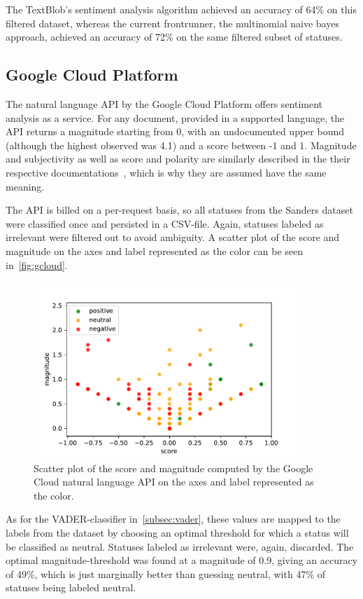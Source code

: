The TextBlob's sentiment analysis algorithm achieved an accuracy of 64\% on this filtered dataset,
whereas the current frontrunner, the multinomial naive bayes approach,
achieved an accuracy of 72\% on the same filtered subset of statuses.

\subsection{Google Cloud Platform}
\label{subsec:googlecloud}

The natural language API by the Google Cloud Platform offers sentiment analysis as a service.
For any document, provided in a supported language, the API returns a magnitude starting from 0, with an undocumented upper bound
(although the highest observed was 4.1) and a score between -1 and 1.
Magnitude and subjectivity as well as score and polarity are similarly described in the their respective documentations~\cite{gcloudDocs}\cite{textblobDocs},
which is why they are assumed have the same meaning.

The API is billed on a per-request basis, so all statuses from the Sanders dataset were classified once and persisted in a CSV-file.
Again, statuses labeled as irrelevant were filtered out to avoid ambiguity.
A scatter plot of the score and magnitude on the axes and label represented as the color can be seen in~\autoref{fig:gcloud}.

\begin{figure}
    \centering
    \caption{Scatter plot of the score and magnitude computed by the Google Cloud natural language API on the axes and label represented as the color.}
    \label{fig:gcloud}
    \includegraphics[width=10cm]{../figures/gcloud.pdf}
\end{figure}

As for the VADER-classifier in~\autoref{subsec:vader}, these values are mapped to the labels from the dataset by
choosing an optimal threshold for which a status will be classified as neutral.
Statuses labeled as irrelevant were, again, discarded.
The optimal magnitude-threshold was found at a magnitude of 0.9, giving an accuracy of 49\%,
which is just marginally better than guessing neutral, with 47\% of statuses being labeled neutral.

